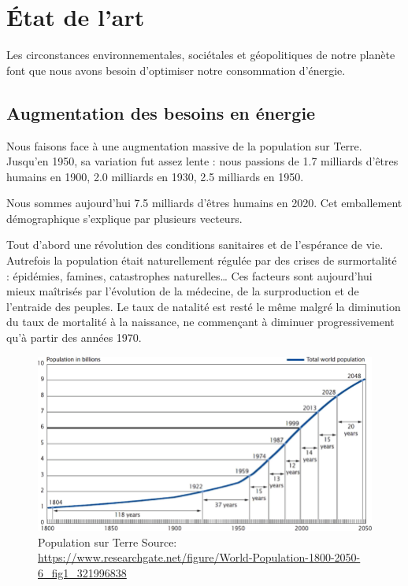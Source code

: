 \chapter{État de l’art}

Les circonstances environnementales, sociétales et géopolitiques de notre planète
font que nous avons besoin d'optimiser notre consommation d'énergie.


\section{Augmentation des besoins en énergie}

Nous faisons face à une augmentation massive de la population sur Terre.
Jusqu'en 1950, sa variation fut assez lente : nous passions de 1.7 milliards d'êtres humains
en 1900, 2.0 milliards en 1930, 2.5 milliards en 1950.

Nous sommes aujourd'hui 7.5 milliards d'êtres humains en 2020. Cet emballement démographique s'explique
par plusieurs vecteurs.

Tout d'abord une révolution des conditions sanitaires et de l'espérance de vie. Autrefois la population
était naturellement régulée par des crises de surmortalité : épidémies, famines, catastrophes naturelles\dots
Ces facteurs sont aujourd'hui mieux maîtrisés par l'évolution de la médecine, de la surproduction et de l'entraide des peuples.
Le taux de natalité est resté le même malgré la diminution du taux de mortalité à la naissance, ne commençant à
diminuer progressivement qu'à partir des années 1970.

\begin{figure}
  \centering
  \includegraphics[scale=0.35]{media/WorldPopulation.png}
  \caption{
      Population sur Terre\newline
      \tiny{Source:\newline
        \url{https://www.researchgate.net/figure/World-Population-1800-2050-6_fig1_321996838}
      }
  }
  \label{fig:capita_energy}
\end{figure}

